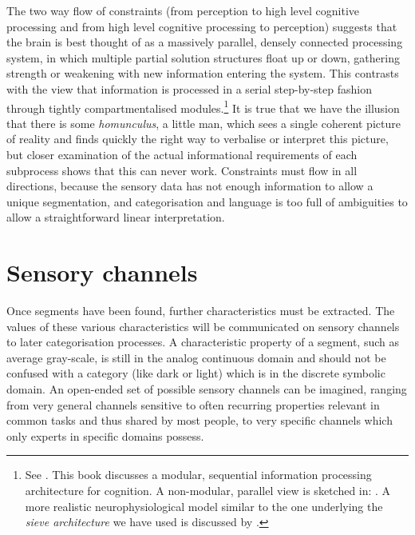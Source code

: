 The two way flow of constraints (from perception to 
high level cognitive processing and from high level 
cognitive processing to perception) suggests 
that the brain is best thought of as a massively parallel, 
densely connected processing system, in which multiple 
partial solution structures float up or down, gathering strength 
or weakening with new information entering the system. 
This contrasts with the view that \enlargethispage{1\baselineskip}
information is processed in a serial step-by-step fashion
through tightly compartmentalised modules.\footnote{
See \cite{Fodor:1983}. This book discusses a modular, sequential 
information processing architecture for cognition. A 
non-modular, parallel view 
is sketched in: \cite{Minsky:1985}. 
A more realistic neurophysiological model similar to the 
one underlying the {\it sieve architecture} we have used is
discussed by \cite{Edelman:1987}.} It is true
that we have the illusion that there 
is some {\itshape homunculus}, a little man, which sees a single coherent 
picture of reality and finds quickly the right way to 
verbalise or interpret this picture, but closer examination 
of the actual informational requirements of each subprocess
shows that this can never work. Constraints must flow in all 
directions, because the sensory data has not enough information to allow 
a unique segmentation, and categorisation and language is 
too full of ambiguities to allow a straightforward linear
interpretation. 

\section{Sensory channels}

Once segments have been found, further characteristics must
be extracted. The values of these various characteristics
will be communicated on sensory channels to later categorisation
processes. A characteristic property of a segment, such as 
average gray-scale, is still in the
analog continuous domain and should not be confused with
a category (like dark or light) which is in the
discrete symbolic domain. An open-ended set of possible sensory 
channels can be imagined, ranging from very general 
channels sensitive to often recurring properties relevant
in common tasks and thus shared by most people, to very 
specific channels which only experts in specific
domains possess. 

